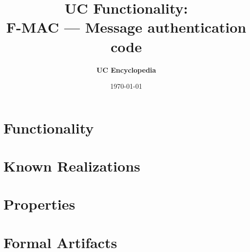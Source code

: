\documentclass[11pt,a4paper]{article}
\title{\textbf{\Large UC Functionality:}\\[0.2em] \Large F-MAC --- Message authentication code}
\author{\textbf{UC Encyclopedia}}
\date{\today}
\newtheorem{functionality}{Functionality}
\begin{document}
\maketitle

\begin{abstract}
\end{abstract}

\section{Functionality}

%

\section{Known Realizations}


\section{Properties}


\section{Formal Artifacts}

\end{document}
